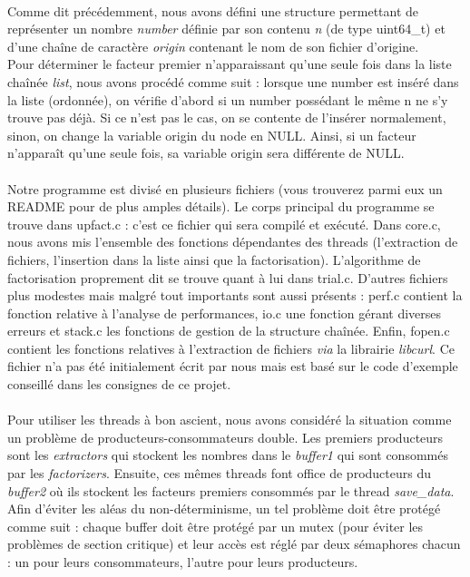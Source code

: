 \documentclass{article}
\begin{document}
\\
Comme dit précédemment, nous avons défini une structure permettant de représenter un nombre \emph{number} définie par son contenu \emph{n} (de type uint64\_t) et d'une chaîne de caractère \emph{origin} contenant le nom de son fichier d'origine.\\
Pour déterminer le facteur premier n'apparaissant qu'une seule fois dans la liste chaînée \emph{list}, nous avons procédé comme suit : lorsque une number est inséré dans la liste (ordonnée), on vérifie d'abord si un number possédant le même n ne s'y trouve pas déjà. Si ce n'est pas le cas, on se contente de l'insérer normalement, sinon, on change la variable origin du node en NULL. Ainsi, si un facteur n'apparaît qu'une seule fois, sa variable origin sera différente de NULL.\\
\\
Notre programme est divisé en plusieurs fichiers (vous trouverez parmi eux un README pour de plus amples détails). Le corps principal du programme se trouve dans upfact.c : c'est ce fichier qui sera compilé et exécuté. Dans core.c, nous avons mis l'ensemble des fonctions dépendantes des threads (l'extraction de fichiers, l'insertion dans la liste ainsi que la factorisation). L'algorithme de factorisation proprement dit se trouve quant à lui dans trial.c. D'autres fichiers plus modestes mais malgré tout importants sont aussi présents : perf.c contient la fonction relative à l'analyse de performances, io.c une fonction gérant diverses erreurs et stack.c les fonctions de gestion de la structure chaînée. Enfin, fopen.c contient les fonctions relatives à l'extraction de fichiers \emph{via} la librairie \emph{libcurl}. Ce fichier n'a pas été initialement écrit par nous mais est basé sur le code d'exemple conseillé dans les consignes de ce projet.\\
\\
Pour utiliser les threads à bon ascient, nous avons considéré la situation comme un problème de producteurs-consommateurs double. Les premiers producteurs sont les \emph{extractors} qui stockent les nombres dans le \emph{buffer1} qui sont consommés par les \emph{factorizers}. Ensuite, ces mêmes threads font office de producteurs du \emph{buffer2} où ils stockent les facteurs premiers consommés par le thread \emph{save\_data}. \\
Afin d'éviter les aléas du non-déterminisme, un tel problème doit être protégé comme suit : chaque buffer doit être protégé par un mutex (pour éviter les problèmes de section critique) et leur accès est réglé par deux sémaphores chacun : un pour leurs consommateurs, l'autre pour leurs producteurs.
\end{document}
